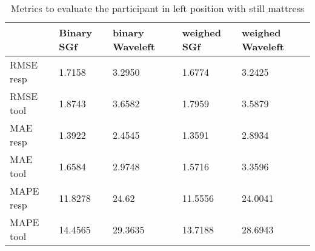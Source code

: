 \begin{table}
\begin{tabular}{|lllll|}
\hline 
& Binary SGf & binary Waveleft & weighed  SGf & weighed Waveleft \\ 

\hline 
RMSE resp &
      1.7158  &  3.2950  &  1.6774  &  3.2425 \\
RMSE  tool &    1.8743  &  3.6582   & 1.7959   & 3.5879 \\
MAE resp & 1.3922 &   2.4545 &     1.3591 &  2.8934 \\ 
MAE tool &     1.6584 & 2.9748 & 1.5716 &  3.3596 \\
MAPE resp & 11.8278 & 24.62 & 11.5556 & 24.0041 \\ 
MAPE tool & 14.4565 & 29.3635 & 13.7188 & 28.6943 \\ 
\hline 
\end{tabular}

\caption{Metrics to evaluate the participant in left position with still mattress}
\end{table}
